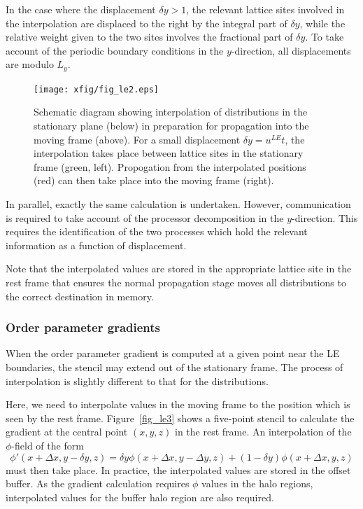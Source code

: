In the case where the displacement $\delta y > 1$, the relevant
lattice sites involved in the interpolation are displaced to the right
by the integral part of $\delta y$, while the relative weight given to
the two sites involves
the fractional part of $\delta y$. To take account of the periodic
boundary conditions
in the $y$-direction, all displacements are modulo $L_y$.


\begin{figure}[h]
\begin{center}
\texttt{[image: xfig/fig\_le2.eps]}
\end{center}
\caption{Schematic diagram showing interpolation of distributions in the
stationary plane (below) in preparation for propagation into the moving
frame (above). For a small displacement $\delta y = u^{LE} t$, the
interpolation takes place between lattice sites in the stationary frame
(green, left). Propogation from the interpolated positions (red) can
then take place into the moving frame (right).}
\label{fig_le2}
\end{figure}


In parallel, exactly the same calculation is undertaken. However,
communication is required to take account of the processor
decomposition in the $y$-direction. This requires the identification
of the two processes which hold the relevant information as a function
of displacement. 

Note that the interpolated values are stored in the appropriate lattice
site in the rest frame that ensures the normal propagation stage moves all
distributions to the correct destination in memory.

\subsubsection{Order parameter gradients}

When the order parameter gradient is computed at a given point
near the LE boundaries, the stencil may extend out of the stationary
frame. The process of interpolation is slightly different to that
for the distributions.

Here, we need to interpolate values in the moving frame to the position
which is seen by the rest frame. Figure~\ref{fig_le3} shows a five-point
stencil to calculate the gradient at the central point $(x,y,z)$ in the
rest frame. An interpolation of the $\phi$-field of the form
\begin{equation}
\phi'(x + \Delta x, y - \delta y, z) =
\delta y \phi(x + \Delta x,  y - \Delta y, z) + 
(1 - \delta y) \phi(x + \Delta x, y, z)
\end{equation}
must then take place. In practice, the interpolated values are stored
in the offset buffer. As the gradient calculation requires $\phi$
values in the halo regions, interpolated values for the buffer halo
region are also required.

